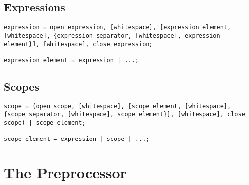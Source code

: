 \documentclass[10pt,a4paper]{article}
\begin{document}
\subsection{Expressions}
\begin{verbatim}
expression = open expression, [whitespace], [expression element, [whitespace], {expression separator, [whitespace], expression element}], [whitespace], close expression;

expression element = expression | ...;
\end{verbatim}

\subsection{Scopes}
\begin{verbatim}
scope = (open scope, [whitespace], [scope element, [whitespace], {scope separator, [whitespace], scope element}], [whitespace], close scope) | scope element;

scope element = expression | scope | ...;
\end{verbatim}

\section{The Preprocessor}
\end{document}
